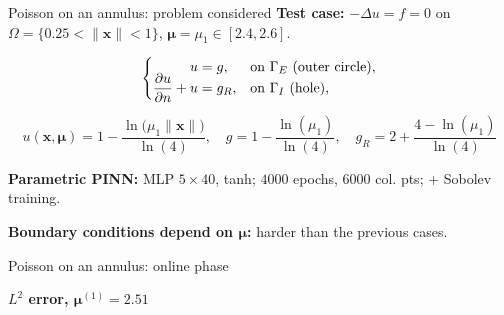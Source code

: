 \begin{frame}{Poisson on an annulus: problem considered}
	\textbf{Test case:} $-\Delta u=f=0$ on $\Omega=\{0.25<\|\bm{x}\|<1\}$, $\bm{\mu}=\mu_1\in[2.4,2.6]$.

	\vspace{-6pt}
	\[
		\left\{
		\begin{aligned}
			u                                       & = g,   &  & \text{on } \Gamma_E \text{ (outer circle)}, \\
			\smash{\frac{\partial u}{\partial n}}+u & = g_R, &  & \text{on } \Gamma_I \text{ (hole)},
		\end{aligned}
		\right.
	\]

	\vspace{4pt}
	\[
		u(\bm{x},\bm{\mu})=1-\frac{\ln\big(\mu_1\|\bm{x}\|\big)}{\ln(4)}, \quad g=1-\frac{\ln(\mu_1)}{\ln(4)}, \quad g_R=2+\frac{4-\ln(\mu_1)}{\ln(4)}
	\]

	\vspace{-4pt}
	\textbf{Parametric PINN:} MLP $5\times 40$, tanh; $4000$ epochs, $6000$ col. pts;  + Sobolev training.

	\vspace{6pt}
	\textbf{Boundary conditions depend on $\bm{\mu}$:} harder than the previous cases.
\end{frame}

\begin{frame}{Poisson on an annulus: online phase}
	\setlength{\plotwidth}{0.38\textwidth}\setlength{\plotheight}{0.27\textwidth}
	\begin{minipage}[t]{0.50\linewidth}
		\vspace{0pt}
		{\centering
			\textbf{$L^2$ error, $\bm{\mu}^{(1)}=2.51$}

			\vspace{-2pt}
			}
	\end{minipage} \hfill \begin{minipage}[t]{0.46\linewidth}
		\vspace{0pt}
	\end{minipage}
\end{frame}

